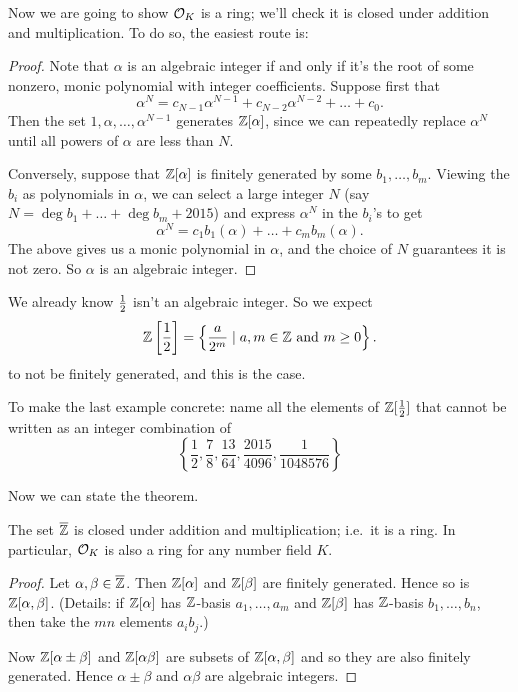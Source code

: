 Now we are going to show $\mathcal O_K$ is a ring;
we'll check it is closed under addition and multiplication.
To do so, the easiest route is:
\newcommand{\tempaeuqnxhj}{$\ZZ[\alpha]$} %
\begin{proof}
	Note that $\alpha$ is an algebraic integer if and only if it's the root
	of some nonzero, monic polynomial with integer coefficients.
	Suppose first that
	\[ \alpha^N = c_{N-1} \alpha^{N-1} + c_{N-2} \alpha^{N-2} + \dots + c_0. \]
	Then the set $1, \alpha, \dots, \alpha^{N-1}$ generates $\mathbb Z[\alpha]$,
	since we can repeatedly replace $\alpha^N$ until all powers of $\alpha$
	are less than $N$.

	Conversely, suppose that $\mathbb Z[\alpha]$ is finitely generated
	by some $b_1, \dots, b_m$.
	Viewing the $b_i$ as polynomials in $\alpha$, we can select a large integer
	$N$ (say $N = \deg b_1 + \dots + \deg b_m + 2015$)
	and express $\alpha^N$ in the $b_i$'s to get
	\[ \alpha^N = c_1b_1(\alpha) + \dots + c_mb_m(\alpha). \]
	The above gives us a monic polynomial in $\alpha$,
	and the choice of $N$ guarantees it is not zero.
	So $\alpha$ is an algebraic integer.
\end{proof}
\begin{example}
	We already know $\frac{1}{2}$ isn't an algebraic integer.
	So we expect 
	\[
		\mathbb Z \left[ \frac{1}{2} \right]
		= \left\{ \frac{a}{2^m} \mid a, m \in \mathbb Z \text{ and } m \ge 0 \right\}.
	\]
	to not be finitely generated, and this is the case.
\end{example}
\begin{ques}
	To make the last example concrete:
	name all the elements of $\mathbb Z[\frac{1}{2}]$
	that cannot be written as an integer combination of
	\[ \left\{ \frac12, \frac{7}{8}, \frac{13}{64},
		\frac{2015}{4096}, \frac{1}{1048576} \right\} \]
\end{ques}

Now we can state the theorem.
\begin{theorem}
	The set $\overline{\mathbb Z}$ is closed under addition and multiplication;
	i.e.\ it is a ring.
	In particular, $\mathcal O_K$ is also a ring for any number field $K$.
\end{theorem}
\begin{proof}
	Let $\alpha, \beta \in \overline{\mathbb Z}$.
	Then $\mathbb Z[\alpha]$ and $\mathbb Z[\beta]$ are finitely generated.
	Hence so is $\mathbb Z[\alpha, \beta]$.
	(Details: if $\mathbb Z[\alpha]$ has $\mathbb Z$-basis $a_1, \dots, a_m$ and
	$\mathbb Z[\beta]$ has $\mathbb Z$-basis $b_1, \dots, b_n$,
	then take the $mn$ elements $a_ib_j$.)

	Now $\mathbb Z[\alpha \pm \beta]$ and $\mathbb Z[\alpha \beta]$ are subsets of $\mathbb Z[\alpha,\beta]$ and so they are also finitely generated.
	Hence $\alpha \pm \beta$ and $\alpha\beta$ are algebraic integers.
\end{proof}

